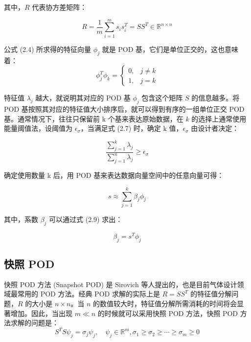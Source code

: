 其中，$R$ 代表协方差矩阵：

\begin{equation}
R = \frac{1}{m} \sum_{i=1}^m s_i s_i^T = S S^T \in \mathbb{R}^{n \times n}
\end{equation}

公式 (2.4) 所求得的特征向量 $\phi_j$ 就是 POD 基，它们是单位正交的，这也意味着：
\begin{equation}
\phi_j^T \phi_k = 
\begin{cases} 
0, & j \neq k \\
1, & j = k 
\end{cases}
\end{equation}

特征值 $\lambda_j$ 越大，就说明其对应的 POD 基 $\phi_j$ 包含这个矩阵 $S$ 的信息越多。将 POD 基按照其对应的特征值大小排序后，就可以得到有序的一组单位正交 POD 基。通常情况下，往往只保留前 k 个基来表达原始数据，在 $k$ 的选择上通常使用能量阈值法，设阈值为 $\epsilon_\sigma$，当满足式 (2.7) 时，确定 k 值，$\epsilon_\sigma$ 由设计者决定：

\begin{equation}
\frac{\sum_{j=1}^k \lambda_j}{\sum_{j=1}^n \lambda_j} \geq \epsilon_\sigma
\end{equation}

确定使用数量 k 后，用 POD 基来表达数据向量空间中的任意向量可得：

\begin{equation}
s \approx \sum_{j=1}^k \beta_j \phi_j
\end{equation}

其中，系数 $\beta_j$ 可以通过式 (2.9) 求出：

\begin{equation}
\beta_j = s^T \phi_j
\end{equation}
\subsection{快照 POD }
快照 POD 方法 (Snapshot POD) 是 Sirovich 等人提出的，也是目前气体设计领域最常用的 POD 方法。经典 POD 求解的实际上是 $R = S S^T$ 的特征值分解问题，$R$ 的大小是 $n \times n$。当 $n$ 的数值较大时，特征值分解所需消耗的时间将会显著增加。因此，当出现 $m \ll n$ 的时候就可以采用快照 POD 方法，快照 POD 方法求解的问题是：
\begin{equation}
S^T S \psi_j = \sigma_j \psi_j, \quad \psi_j \in \mathbb{R}^m, \sigma_1 \geq \sigma_2 \geq \cdots \geq \sigma_m \geq 0
\end{equation}

